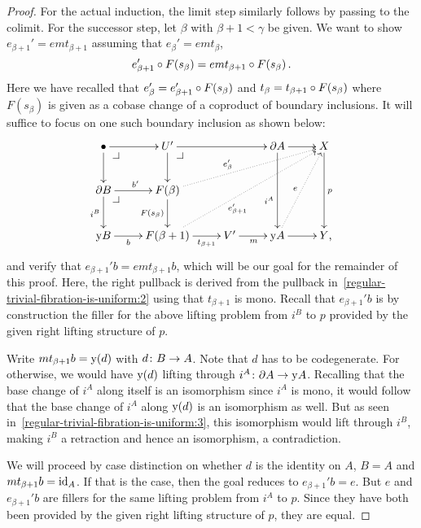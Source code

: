 \documentclass[reqno,10pt,a4paper,oneside]{amsart}
\begin{document}
\begin{proof}
For the actual induction, the limit step similarly follows by passing to the colimit.
For the successor step, let $\beta$ with $\beta + 1 < \gamma$ be given.
We want to show $e_{\beta+1}' = e m t_{\beta+1}$ assuming that $e_{\beta}' = e m t_{\beta}$, \ie
\begin{equation} \label{regular-trivial-fibration-is-uniform:ih}
  e_{\beta+1}' \mathbin{\circ} F(s_{\beta}) = e m t_{\beta+1} \mathbin{\circ} F(s_{\beta}) \, .
\end{equation}
Here we have recalled that $e_{\beta}' = e_{\beta+1}' \mathbin{\circ} F(s_{\beta})$ and $t_{\beta} = t_{\beta+1} \mathbin{\circ} F(s_{\beta})$ where $F(s_{\beta})$ is given as a cobase change of a coproduct of boundary inclusions.
It will suffice to focus on one such boundary inclusion as shown below:
\begin{equation} \label{regular-trivial-fibration-is-uniform:3}
\xycenter{
  \bullet
  \ar[r]
  \ar[d]
  \pullback{dr}
&
  U'
  \ar[rr]
  \ar[d]
  \pullback{dr}
&&
  \partial A
  \ar[r]
  \ar[dd]_(0.6){i^A}
&
  X
  \ar[dd]^{p}
\\
  \partial B
  \ar[r]^{b'}
  \ar[d]_{i^B}
  \pullback{dr}
&
  F(\beta)
  \ar[d]_{F(s_{\beta})}
  \ar@{.>}[urrr]^(0.4){e_{\beta}'}
\\
  \yon B
  \ar[r]_-{b}
&
  F(\beta+1)
  \ar[r]_-{t_{\beta+1}}
  \ar@{.>}[uurrr]_(0.4){e_{\beta+1}'}
&
  V'
  \ar[r]_{m}
&
  \yon A
  \ar[r]
  \ar@{.>}[uur]^{e}
&
  Y
\rlap{,}}
\end{equation}
and verify that $e_{\beta+1}' b = e m t_{\beta+1} b$, which will be our goal for the remainder of this proof.
Here, the right pullback is derived from the pullback in~\eqref{regular-trivial-fibration-is-uniform:2} using that $t_{\beta+1}$ is mono.
Recall that $e_{\beta+1}' b$ is by construction the filler for the above lifting problem from $i^B$ to $p$ provided by the given right lifting structure of $p$.

Write $m t_{\beta+1} b = \mathrm{y}(d)$ with $d \colon B \to A$.
Note that $d$ has to be codegenerate.
For otherwise, we would have $\mathrm{y}(d)$ lifting through $i^A \colon \partial A \to \mathrm{y} A$.
Recalling that the base change of $i^A$ along itself is an isomorphism since $i^A$ is mono, it would follow that the base change of $i^A$ along $\mathrm{y}(d)$ is an isomorphism as well.
But as seen in~\eqref{regular-trivial-fibration-is-uniform:3}, this isomorphism would lift through $i^B$, making $i^B$ a retraction and hence an isomorphism, a contradiction.

We will proceed by case distinction on whether $d$ is the identity on $A$, \ie $B = A$ and $m t_{\beta+1} b = \operatorname{id}_A$.
If that is the case, then the goal reduces to $e_{\beta+1}' b = e$.
But $e$ and $e_{\beta+1}' b$ are fillers for the same lifting problem from $i^A$ to $p$.
Since they have both been provided by the given right lifting structure of $p$, they are equal.


\end{proof}
\end{document}
